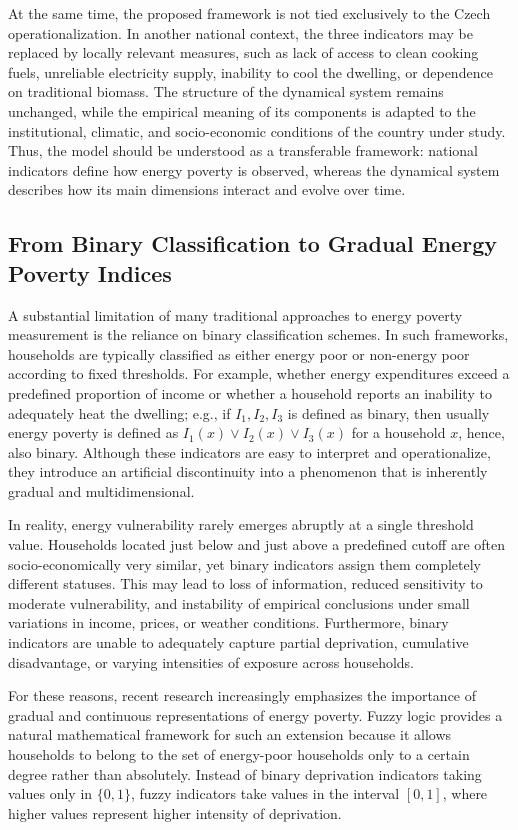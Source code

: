 \documentclass[11pt,a4paper]{article}
\begin{document}
At the same time, the proposed framework is not tied exclusively to the Czech operationalization. In another national context, the three indicators may be replaced by locally relevant measures, such as lack of access to clean cooking fuels, unreliable electricity supply, inability to cool the dwelling, or dependence on traditional biomass. The structure of the dynamical system remains unchanged, while the empirical meaning of its components is adapted to the institutional, climatic, and socio-economic conditions of the country under study. Thus, the model should be understood as a transferable framework: national indicators define how energy poverty is observed, whereas the dynamical system describes how its main dimensions interact and evolve over time.

\subsection{From Binary Classification to Gradual Energy Poverty Indices}

A substantial limitation of many traditional approaches to energy poverty measurement is the reliance on binary classification schemes. In such frameworks, households are typically classified as either energy poor or non-energy poor according to fixed thresholds. For example, whether energy expenditures exceed a predefined proportion of income or whether a household reports an inability to adequately heat the dwelling; e.g., if $I_1, I_2,I_3$ is defined as binary, then usually energy poverty is defined as $I_1(x)\vee I_2(x)\vee I_3(x)$ for a household $x$, hence, also binary. Although these indicators are easy to interpret and operationalize, they introduce an artificial discontinuity into a phenomenon that is inherently gradual and multidimensional.

In reality, energy vulnerability rarely emerges abruptly at a single threshold value. Households located just below and just above a predefined cutoff are often socio-economically very similar, yet binary indicators assign them completely different statuses. This may lead to loss of information, reduced sensitivity to moderate vulnerability, and instability of empirical conclusions under small variations in income, prices, or weather conditions. Furthermore, binary indicators are unable to adequately capture partial deprivation, cumulative disadvantage, or varying intensities of exposure across households.

For these reasons, recent research increasingly emphasizes the importance of gradual and continuous representations of energy poverty. Fuzzy logic provides a natural mathematical framework for such an extension because it allows households to belong to the set of energy-poor households only to a certain degree rather than absolutely. Instead of binary deprivation indicators taking values only in $\{0,1\}$, fuzzy indicators take values in the interval $[0,1]$, where higher values represent higher intensity of deprivation.
\end{document}
